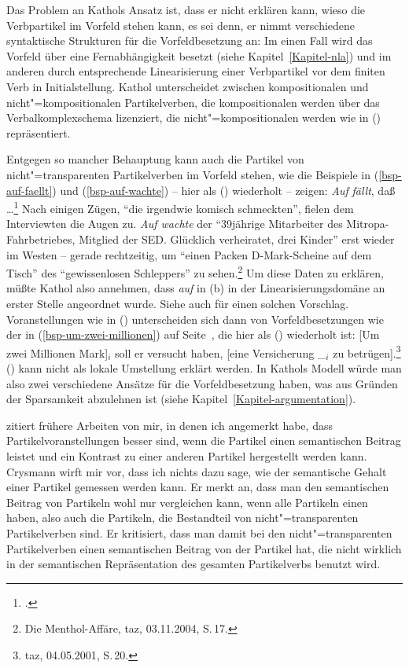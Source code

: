 Das Problem an Kathols Ansatz ist, dass er nicht erklären kann, wieso die Verbpartikel
im Vorfeld stehen kann, es sei denn, er nimmt verschiedene syntaktische Strukturen für die
Vorfeldbesetzung an: Im einen Fall wird das Vorfeld über eine Fernabhängigkeit
besetzt (siehe Kapitel~\ref{Kapitel-nla}) und im anderen durch entsprechende Linearisierung einer
Verbpartikel vor dem finiten Verb in Initialstellung. Kathol unterscheidet zwischen kompositionalen
und nicht"=kompositionalen Partikelverben, die kompositionalen werden über das Verbalkomplexschema
lizenziert, die nicht"=kompositionalen werden wie in () repräsentiert.

Entgegen so mancher Behauptung kann auch die Partikel von nicht"=transparenten Partikelverben im
Vorfeld stehen, wie die Beispiele in (\ref{bsp-auf-faellt}) und (\ref{bsp-auf-wachte}) -- hier als ()
wiederholt -- zeigen:
\eal
\ex{}
\emph{Auf} \emph{fällt}, daß \ldots\footnote{
        .%
}
\ex Nach einigen Zügen, "`die irgendwie komisch schmeckten"', fielen dem Interviewten die Augen zu. 
\emph{Auf wachte} der "`39jährige Mitarbeiter des Mitropa-Fahrbetriebes, Mitglied der SED. Glücklich verheiratet, drei Kinder"'
erst wieder im Westen -- gerade rechtzeitig, um "`einen Packen D-Mark-Scheine auf dem Tisch"' 
des "`gewissenlosen Schleppers"' zu sehen.\footnote{
  Die Menthol-Affäre, taz, 03.11.2004, S.\,17.%
}
\zl
Um diese Daten zu erklären, müßte Kathol also annehmen, dass \emph{auf} in (b)
in der Linearisierungsdomäne an erster Stelle angeordnet wurde. Siehe auch 
für einen solchen Vorschlag.
Voranstellungen wie in () unterscheiden sich dann von Vorfeldbesetzungen wie der in 
(\ref{bsp-um-zwei-millionen}) auf Seite~\pageref{bsp-um-zwei-millionen},
die hier als () wiederholt ist:
\ea\label{bsp-um-zwei-millionen-zwei}
{}[Um zwei Millionen Mark]$_i$ soll er versucht haben, [eine Versicherung \_$_i$ zu betrügen].\footnote{
         taz, 04.05.2001, S.\,20.
}
\z
() kann nicht als lokale Umstellung erklärt werden.
In Kathols Modell würde man also zwei verschiedene Ansätze für die Vorfeldbesetzung haben,
was aus Gründen der Sparsamkeit abzulehnen ist (siehe Kapitel~\ref{Kapitel-argumentation}).

\citet[Kapitel~4.2]{Crysmann2002a} zitiert frühere Arbeiten von mir, in denen ich angemerkt
habe, dass Partikelvoranstellungen besser sind, wenn die Partikel einen semantischen
Beitrag leistet und ein Kontrast zu einer anderen Partikel hergestellt werden kann.
\eal
{}
\zl
Crysmann wirft mir vor, dass ich nichts dazu sage, wie der semantische
Gehalt einer Partikel gemessen werden kann. Er merkt an, dass man den semantischen
Beitrag von Partikeln wohl nur vergleichen kann, wenn alle Partikeln einen
\contw haben, also auch die Partikeln, die Bestandteil von nicht"=transparenten
Partikelverben sind. Er kritisiert, dass man damit bei den nicht"=transparenten
Partikelverben einen semantischen Beitrag von der Partikel hat, die nicht wirklich
in der semantischen Repräsentation des gesamten Partikelverbs benutzt wird. 


